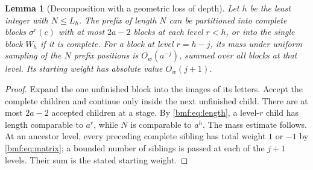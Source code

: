 \documentclass[11pt]{article}
\numberwithin{equation}{section}
\newtheorem{lemma}[theorem]{Lemma}
\theoremstyle{definition}
\theoremstyle{remark}
\begin{document}
\begin{lemma}[Decomposition with a geometric loss of depth]\label{bmf:lem:decompose}
Let $h$ be the least integer with $N\leq L_h$.
The prefix of length $N$ can be partitioned into complete blocks
$\sigma^r(c)$ with at most $2a-2$ blocks at each level $r<h$,
or into the single block $W_h$ if it is complete.
For a block at level $r=h-j$, its mass under uniform sampling
of the $N$ prefix positions is $O_w(a^{-j})$, summed over
all blocks at that level. Its starting weight has absolute value
$O_w(j+1)$.
\end{lemma}
\begin{proof}
Expand the one unfinished block into the images of its letters.
Accept the complete children and continue only inside the next
unfinished child. There are at most $2a-2$ accepted children at
a stage. By \eqref{bmf:eq:length}, a level-$r$ child has length
comparable to $a^r$, while $N$ is comparable to $a^h$.
The mass estimate follows. At an ancestor level, every preceding
complete sibling has total weight $1$ or $-1$ by
\eqref{bmf:eq:matrix}; a bounded number of siblings is passed at
each of the $j+1$ levels. Their sum is the stated starting weight.
\end{proof}
\end{document}

